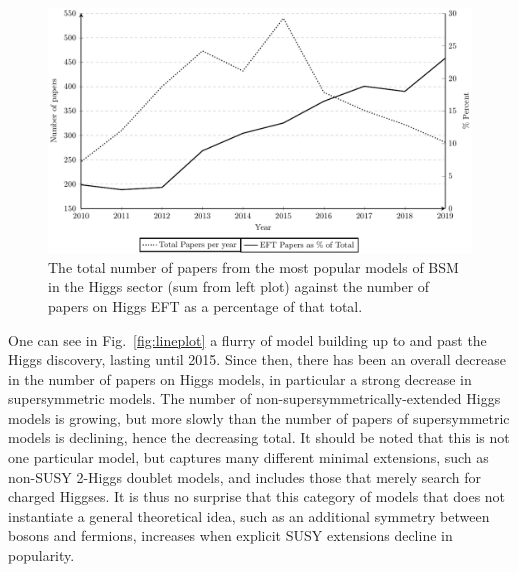 \begin{figure}
\includegraphics[width=\textwidth]{percenttotal_eft_2107}
\caption{The total number of papers from the most popular models of BSM in the Higgs sector (sum from left plot) against the number of papers on Higgs EFT as a percentage of that total.}
\label{fig:percent}
\end{figure}


One can see in Fig.~\ref{fig:lineplot} a flurry of model building up to and past the Higgs discovery, lasting until 2015. 
Since then, there has been an overall decrease in the number of papers on Higgs models, in particular a strong decrease in supersymmetric models. 
The number of non-supersymmetrically-extended Higgs models is growing, but more slowly than the number of papers of supersymmetric models is declining, hence the decreasing total. 
It should be noted that this is not one particular model, but captures many different minimal extensions, such as non-SUSY 2-Higgs doublet models, and includes those that merely search for charged Higgses.
It is thus no surprise that this category of models that does not instantiate a general theoretical idea, such as an additional symmetry between bosons and fermions, increases when explicit SUSY extensions decline in popularity.

